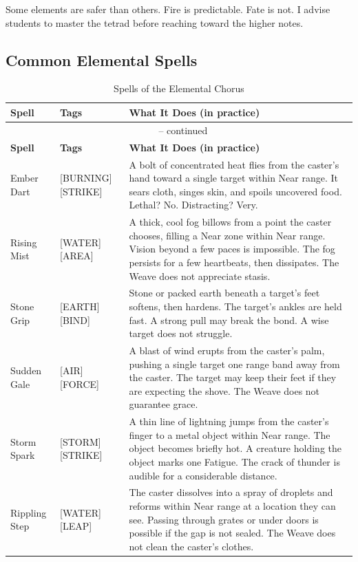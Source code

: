 Some elements are safer than others. Fire is predictable. Fate is not. I advise students to master the tetrad before reaching toward the higher notes.

\subsection{Common Elemental Spells}

\noindent
\begin{longtable}{p{} p{} p{}}
\caption{Spells of the Elemental Chorus}\\
\midrule
\textbf{Spell} & \textbf{Tags} & \textbf{What It Does (in practice)}\\
\midrule
\endfirsthead
\multicolumn{3}{c}{\tablename\ \thetable{} -- continued}\\
\midrule
\textbf{Spell} & \textbf{Tags} & \textbf{What It Does (in practice)}\\
\midrule
\endhead
Ember Dart & [BURNING][STRIKE] & A bolt of concentrated heat flies from the caster's hand toward a single target within Near range. It sears cloth, singes skin, and spoils uncovered food. Lethal? No. Distracting? Very. \\
Rising Mist & [WATER][AREA] & A thick, cool fog billows from a point the caster chooses, filling a Near zone within Near range. Vision beyond a few paces is impossible. The fog persists for a few heartbeats, then dissipates. The Weave does not appreciate stasis. \\
Stone Grip & [EARTH][BIND] & Stone or packed earth beneath a target's feet softens, then hardens. The target's ankles are held fast. A strong pull may break the bond. A wise target does not struggle. \\
Sudden Gale & [AIR][FORCE] & A blast of wind erupts from the caster's palm, pushing a single target one range band away from the caster. The target may keep their feet if they are expecting the shove. The Weave does not guarantee grace. \\
Storm Spark & [STORM][STRIKE] & A thin line of lightning jumps from the caster's finger to a metal object within Near range. The object becomes briefly hot. A creature holding the object marks one Fatigue. The crack of thunder is audible for a considerable distance. \\
Rippling Step & [WATER][LEAP] & The caster dissolves into a spray of droplets and reforms within Near range at a location they can see. Passing through grates or under doors is possible if the gap is not sealed. The Weave does not clean the caster's clothes. \\

\end{longtable}
